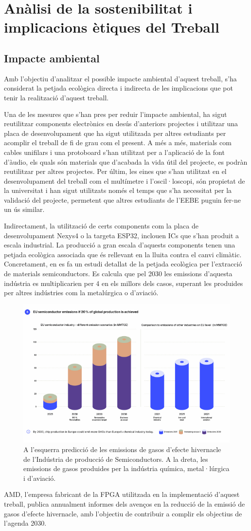 \chapter{Anàlisi de la sostenibilitat i implicacions ètiques del Treball}
\section{Impacte ambiental}
\par Amb l'objectiu d'analitzar el possible impacte ambiental d'aquest treball, s'ha considerat la petjada ecològica directa i indirecta de les implicacions que pot tenir la realització d'aquest treball. 
\par Una de les mesures que s'han pres per reduir l'impacte ambiental, ha sigut reutilitzar components electrònics en desús d'anteriors projectes i utilitzar una placa de desenvolupament que ha sigut utilitzada per altres estudiants per acomplir el treball de fi de grau com el present. A més a més, materials com cables unifilars i una protoboard s'han utilitzat per a l'aplicació de la font d'àudio, els quals són materials que d'acabada la vida útil del projecte, es podràn reutilitzar per altres projectes. Per últim, les eines que s'han utilitzat en el desenvolupament del treball com el multímetre i l'oscil·loscopi, són propietat de la universitat i han sigut utilitzats només el temps que s'ha necessitat per la validació del projecte, permetent que altres estudiants de l'EEBE puguin fer-ne un ús similar.
\par Indirectament, la utilització de certs components com la placa de desenvolupament Nexys4 o la targeta ESP32, inclouen ICs que s'han produit a escala industrial. La producció a gran escala d'aquests components tenen una petjada ecològica associada que és rellevant en la lluita contra el canvi climàtic. Concretament, en \cite{FtprntEco} es fa un estudi detallat de la petjada ecològica per l'extracció de materials semiconductors. Es calcula que pel 2030 les emissions d'aquesta indústria es multiplicarien per 4 en els millors dels casos, superant les produides per altres indústries com la metalúrgica o d'aviació.
\begin{figure}[H]
    \centering
    \includegraphics[width=0.25\linewidth]{Images/graf_ambienta.png}
    \caption{A l'esquerra predicció de les emissions de gasos d'efecte hivernacle de l'Indústria de producció de Semiconductors. A la dreta, les emissions de gasos produides per la indústria química, metal·lúrgica i d'aviació.\cite{FtprntEco}}
    \label{figGrafhivern}
\end{figure}
\par AMD, l'empresa fabricant de la FPGA utilitzada en la implementació d'aquest treball, publica annualment informes dels avenços en la reducció de la emissió de gasos d'efecte hivernacle, amb l'objectiu de contribuir a complir els objectius de l'agenda 2030.\cite{AMDGHG}

